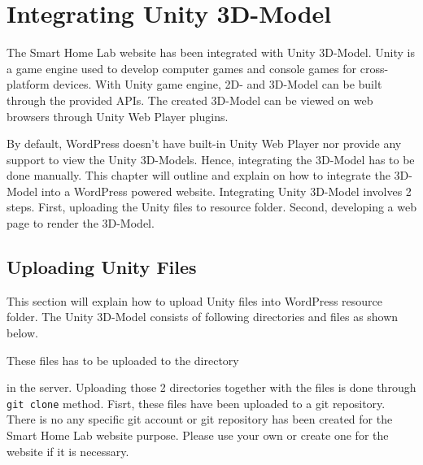 \chapter{Integrating Unity 3D-Model} \label{sec:unity-integrating-unity-3d-model}

The Smart Home Lab website has been integrated with Unity 3D-Model. Unity is a game engine used to develop computer games and console games for cross-platform devices. With Unity game engine, 2D- and 3D-Model can be built through the provided APIs. The created 3D-Model can be viewed on web browsers through Unity Web Player plugins.

By default, WordPress doesn't have built-in Unity Web Player nor provide any support to view the Unity 3D-Models. Hence, integrating the 3D-Model has to be done manually. This chapter will outline and explain on how to integrate the 3D-Model into a WordPress powered website. Integrating Unity 3D-Model involves 2 steps. First, uploading the Unity files to resource folder. Second, developing a web page to render the 3D-Model.

\section{Uploading Unity Files} \label{sec:unity-uploading-unity-files}
This section will explain how to upload Unity files into WordPress resource folder. The Unity 3D-Model consists of following directories and files as shown below. 
\newline


\bigskip

These files has to be uploaded to the directory \begin{quote}\end{quote} in the server. Uploading those 2 directories together with the files is done through \texttt{git clone} method. Fisrt, these files have been uploaded to a git repository. There is no any specific git account or git repository has been created for the Smart Home Lab website purpose. Please use your own or create one for the website if it is necessary.

